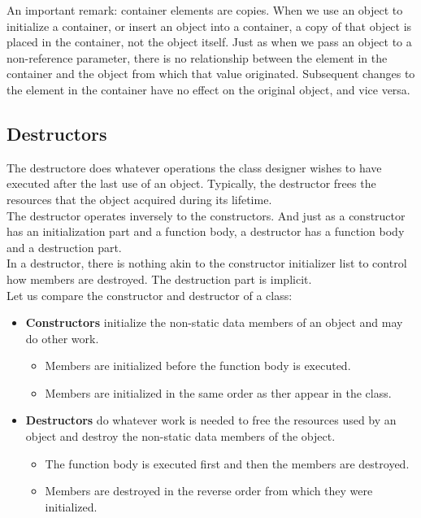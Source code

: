 An important remark: container elements are copies. When we use an object to initialize
a container, or insert an object into a container, a copy of that object is placed in the
container, not the object itself. Just as when we pass an object to a non-reference
parameter, there is no relationship between the element in the container and the object
from which that value originated. Subsequent changes to the element in the container
have no effect on the original object, and vice versa.

\subsection{Destructors}

The destructore does whatever operations the class designer wishes to have executed
after the last use of an object. Typically, the destructor frees the resources that
the object acquired during its lifetime.\\

The destructor operates inversely to the constructors. And just as a constructor has 
an initialization part and a function body, a destructor has a function body and a
destruction part.\\

In a destructor, there is nothing akin to the constructor initializer list to control
how members are destroyed. The destruction part is implicit.\\

Let us compare the constructor and destructor of a class:

\begin{itemize}
    \item \textbf{Constructors} initialize the non-static data members of an object 
    and may do other work.
    \begin{itemize}
        \item Members are initialized before the function body is executed.
        \item Members are initialized in the same order as ther appear in the class.
    \end{itemize}

    \item \textbf{Destructors} do whatever work is needed to free the resources used by
    an object and destroy the non-static data members of the object.
    \begin{itemize}
        \item The function body is executed first and then the members are destroyed.
        \item Members are destroyed in the reverse order from which they were initialized.
    \end{itemize}
\end{itemize}

